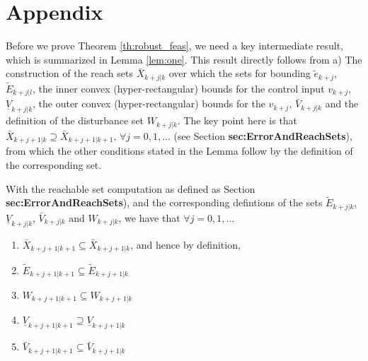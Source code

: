 \section*{Appendix}

Before we prove Theorem \ref{th:robust_feas}, we need a key intermediate result, which is summarized in Lemma \ref{lem:one}. This result directly follows from a) The construction of the reach sets $\bar{X}_{k+j|k}$ over which the sets for bounding $\tilde{e}_{k+j}$, $\tilde{E}_{k+j|l}$, the inner convex (hyper-rectangular) bounds for the control input $v_{k+j}$, $\underline{V}_{k+j|k}$, the outer convex (hyper-rectangular) bounds for the  $v_{k+j}$, $\bar{V}_{k+j|k}$ and the definition of the disturbance set $W_{k+j|k}$. The key point here is that $\bar{X}_{k+j+1|k} \supseteq \bar{X}_{k+j+1|k+1}, \, \forall j=0,1,\dotsc$ (see Section \textbf{sec:ErrorAndReachSets}), from which the other conditions stated in the Lemma follow by the definition of the corresponding set.

\begin{lemma}
\label{lem:one}
With the reachable set computation as defined as Section \textbf{sec:ErrorAndReachSets}), and the corresponding defintions of the sets $\tilde{E}_{k+j|k}$, $\underline{V}_{k+j|k}$, $\bar{V}_{k+j|k}$ and $W_{k+j|k}$, we have that $\forall j=0,1,\dotsc$
\begin{enumerate}
\item $\bar{X}_{k+j+1|k+1} \subseteq \bar{X}_{k+j+1|k}$, and hence by definition,
\item $\tilde{E}_{k+j+1|k+1} \subseteq \tilde{E}_{k+j+1|k}$
\item ${W}_{k+j+1|k+1} \subseteq {W}_{k+j+1|k}$
\item $\underline{V}_{k+j+1|k+1} \supseteq \underline{V}_{k+j+1|k}$
\item $\bar{V}_{k+j+1|k+1} \subseteq \bar{V}_{k+j+1|k}$
\end{enumerate}
\end{lemma} 